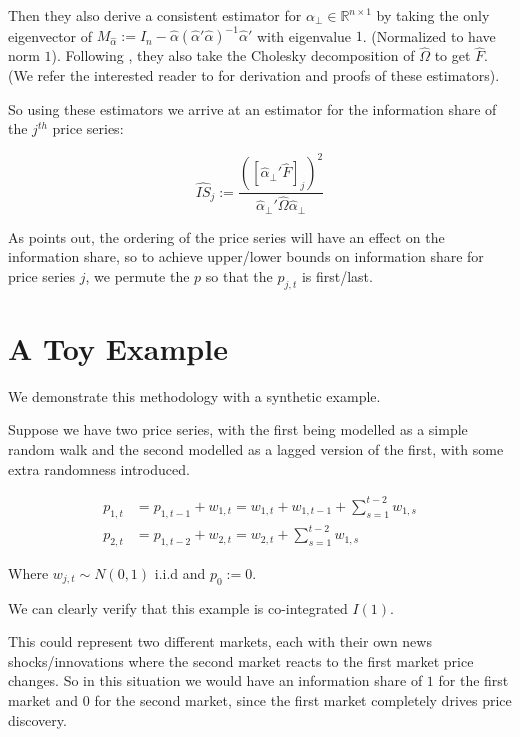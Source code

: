 \documentclass[a4paper, oneside, notitlepage]{book}
\begin{document}
Then they also derive a consistent estimator for $\alpha_{\perp} \in \mathbb{R}^{n \times 1}$ by taking the only eigenvector of $M_{\hat{\alpha}} := I_{n} - \hat{\alpha}(\hat{\alpha}' \hat{\alpha})^{-1} \hat{\alpha}'$ with eigenvalue $1$. (Normalized to have norm $1$).
Following \cite{HASBROUCK1995}, they also take the Cholesky decomposition of $\hat{\Omega}$ to get $\hat{F}$.
(We refer the interested reader to \cite{KARABIYIK2022} for derivation and proofs of these estimators).

So using these estimators we arrive at an estimator for the information share of the $j^{th}$ price series:

\begin{equation}
    \hat{IS}_{j} := \frac{([ \hat{\alpha}_{\perp}'\hat{F}]_{j})^2}{\hat{\alpha}_{\perp}' \hat{\Omega} \hat{\alpha}_{\perp}}
\end{equation}

As \cite{HASBROUCK1995} points out, the ordering of the price series will have an effect on the information share, so to achieve upper/lower bounds on information share for price series $j$, we permute the $p$ so that the $p_{j, t}$ is first/last.


\section{A Toy Example}
We demonstrate this methodology with a synthetic example.

Suppose we have two price series, with the first being modelled as a simple random walk
and the second modelled as a lagged version of the first, with some extra randomness introduced.

\begin{align}
    p_{1, t} &= p_{1, t-1} + w_{1, t} = w_{1, t} + w_{1, t-1} + \sum_{s=1}^{t-2} w_{1, s} \label{toy1}\\
    p_{2, t} &= p_{1, t-2} + w_{2, t} = w_{2, t} + \sum_{s=1}^{t-2} w_{1, s} \label{toy2}
\end{align}

Where $w_{j, t} \sim N(0, 1)$ i.i.d and $p_0 := 0$.

We can clearly verify that this example is co-integrated $I(1)$.

This could represent two different markets, each with their own news shocks/innovations
where the second market reacts to the first market price changes. So in this
situation we would have an information share of $1$ for the first market and $0$ for the
second market, since the first market completely drives price discovery.
\end{document}
